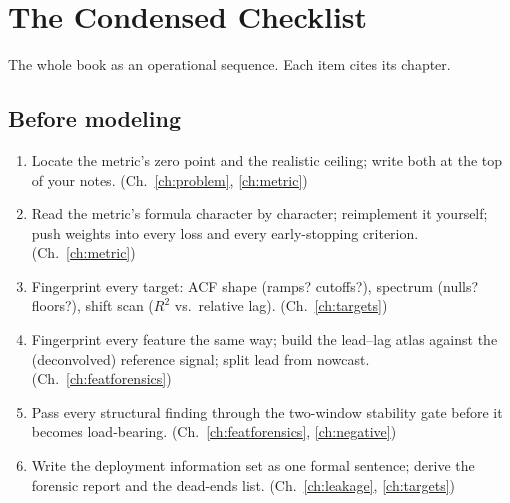 \chapter{The Condensed Checklist}
\label{app:checklist}

The whole book as an operational sequence. Each item cites its chapter.

\section*{Before modeling}
\begin{enumerate}[label=\arabic*., itemsep=1pt]
\item Locate the metric's zero point and the realistic ceiling; write both
  at the top of your notes. (Ch.~\ref{ch:problem}, \ref{ch:metric})
\item Read the metric's formula character by character; reimplement it
  yourself; push weights into every loss and every early-stopping
  criterion. (Ch.~\ref{ch:metric})
\item Fingerprint every target: ACF shape (ramps? cutoffs?), spectrum
  (nulls? floors?), shift scan ($R^2$ vs.\ relative lag).
  (Ch.~\ref{ch:targets})
\item Fingerprint every feature the same way; build the lead--lag atlas
  against the (deconvolved) reference signal; split lead from nowcast.
  (Ch.~\ref{ch:featforensics})
\item Pass every structural finding through the two-window stability gate
  before it becomes load-bearing. (Ch.~\ref{ch:featforensics},
  \ref{ch:negative})
\item Write the deployment information set as one formal sentence; derive
  the forensic report and the dead-ends list. (Ch.~\ref{ch:leakage},
  \ref{ch:targets})
\end{enumerate}

